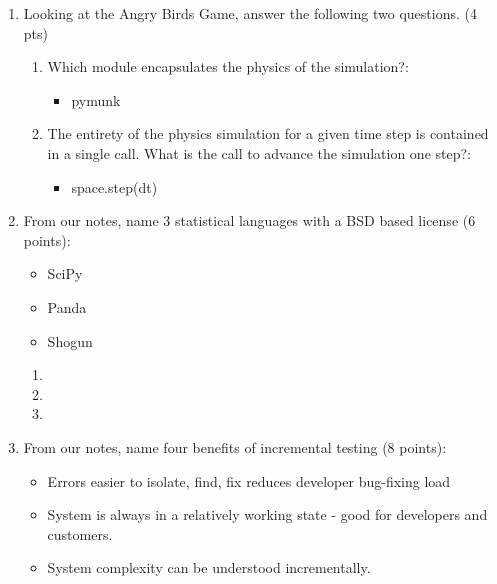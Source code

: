 \documentclass[10pt]{article}
\begin{document}
\begin{enumerate}
\begin{enumerate}
    \item Looking at the Angry Birds Game, answer the following two questions. (4 pts)
	\begin{enumerate}
	\item Which module encapsulates the physics of the simulation?:
	    \beginanswers
	        \begin{itemize}
		\item pymunk
		\end{itemize}
	    \else
            \bigskip
            \bigskip
            \bigskip
            \bigskip
            \fi
        \item The entirety of the physics simulation for a given time step is contained in a single call. What is the call to advance the simulation one step?:
	    \beginanswers
                \begin{itemize}
                \item space.step(dt) 
		\end{itemize}
            \else
            \bigskip
            \bigskip
            \bigskip
            \bigskip
	    \fi
	\end{enumerate}
    \bigskip
    \bigskip
    \item From our notes, name 3 statistical  languages with a BSD based license (6 points):
        \beginanswers
            \begin{itemize}
	    \item SciPy
	    \item Panda
	    \item Shogun
            \end{itemize}
        \else
            \begin{enumerate}
	    \item 
	    \bigskip
	    \bigskip
	    \item
	    \bigskip
	    \bigskip
	    \item 
	    \bigskip
	    \bigskip
            \end{enumerate}
        \fi
    \bigskip
    \bigskip
    \item From our notes, name four benefits of incremental testing (8 points):
        \beginanswers
            \begin{itemize}
	    \item Errors easier to isolate, find, fix reduces developer bug-fixing load
	    \item System is always in a relatively working state - good for developers and customers.
	    \item System complexity can be understood incrementally.

\end{itemize}
\end{enumerate}
\end{enumerate}
\end{document}
